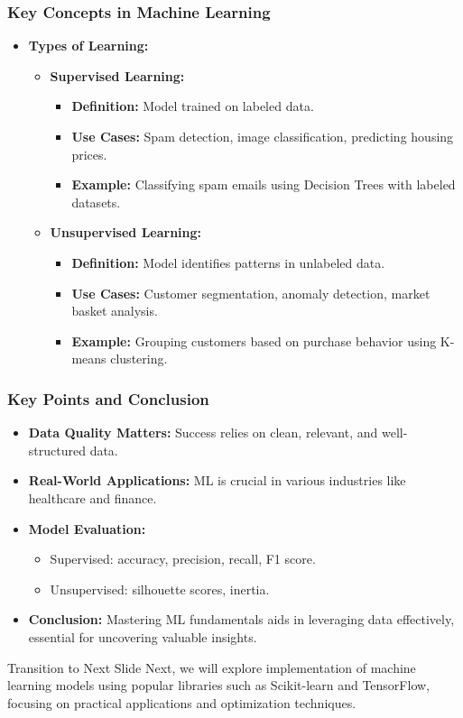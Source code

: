\documentclass[aspectratio=169]{beamer}
\begin{document}
\begin{frame}[fragile]
    \frametitle{Key Concepts in Machine Learning}
    \begin{itemize}
        \item \textbf{Types of Learning:}
        \begin{itemize}
            \item \textbf{Supervised Learning:} 
            \begin{itemize}
                \item \textbf{Definition:} Model trained on labeled data.
                \item \textbf{Use Cases:} Spam detection, image classification, predicting housing prices.
                \item \textbf{Example:} Classifying spam emails using Decision Trees with labeled datasets.
            \end{itemize}
            \item \textbf{Unsupervised Learning:}
            \begin{itemize}
                \item \textbf{Definition:} Model identifies patterns in unlabeled data.
                \item \textbf{Use Cases:} Customer segmentation, anomaly detection, market basket analysis.
                \item \textbf{Example:} Grouping customers based on purchase behavior using K-means clustering.
            \end{itemize}
        \end{itemize}
    \end{itemize}
\end{frame}

\begin{frame}[fragile]
    \frametitle{Key Points and Conclusion}
    \begin{itemize}
        \item \textbf{Data Quality Matters:} Success relies on clean, relevant, and well-structured data.
        \item \textbf{Real-World Applications:} ML is crucial in various industries like healthcare and finance.
        \item \textbf{Model Evaluation:}
        \begin{itemize}
            \item Supervised: accuracy, precision, recall, F1 score.
            \item Unsupervised: silhouette scores, inertia.
        \end{itemize}
        \item \textbf{Conclusion:} Mastering ML fundamentals aids in leveraging data effectively, essential for uncovering valuable insights.
    \end{itemize}
    \begin{block}{Transition to Next Slide}
        Next, we will explore implementation of machine learning models using popular libraries such as Scikit-learn and TensorFlow, focusing on practical applications and optimization techniques.
    \end{block}
\end{frame}
\end{document}

